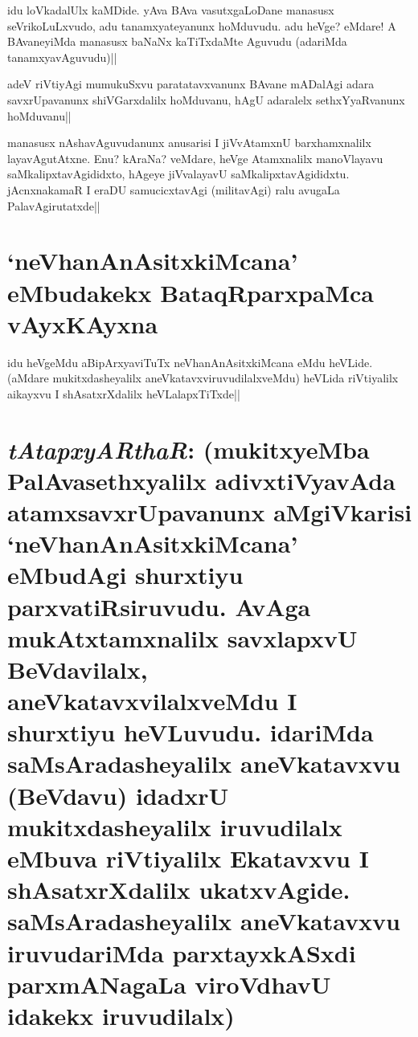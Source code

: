 \begin{artha} 
idu loVkadalUlx kaMDide. yAva BAva vasutxgaLoDane manasusx 
seVrikoLuLxvudo, adu tanamxyateyanunx hoMduvudu. adu heVge? eMdare! A 
BAvaneyiMda manasusx baNaNx kaTiTxdaMte Aguvudu (adariMda 
tanamxyavAguvudu)||
\end{artha}

\begin{artha} 
adeV riVtiyAgi mumukuSxvu paratatavxvanunx BAvane mADalAgi adara 
savxrUpavanunx shiVGarxdalilx hoMduvanu, hAgU adaralelx 
sethxYyaRvanunx hoMduvanu||
\end{artha}

\begin{artha} 
manasusx nAshavAguvudanunx anusarisi I jiVvAtamxnU barxhamxnalilx 
layavAgutAtxne. Enu? kAraNa? veMdare, heVge Atamxnalilx manoVlayavu 
saMkalipxtavAgididxto, hAgeye jiVvalayavU saMkalipxtavAgididxtu. 
jAcnxnakamaR I eraDU samucicxtavAgi (militavAgi) ralu avugaLa 
PalavAgirutatxde|| 
\end{artha}

\section*{`neVhanAnAsitxkiMcana' eMbudakekx BataqRparxpaMca vAyxKAyxna}


\begin{artha} 
idu heVgeMdu aBipArxyaviTuTx neVhanAnAsitxkiMcana eMdu heVLide. 
(aMdare mukitxdasheyalilx aneVkatavxviruvudilalxveMdu) heVLida 
riVtiyalilx aikayxvu I shAsatxrXdalilx heVLalapxTiTxde||
\end{artha}


\section*{\textit{tAtapxyARthaR}: (mukitxyeMba PalAvasethxyalilx adivxtiVyavAda 
atamxsavxrUpavanunx 
aMgiVkarisi `neVhanAnAsitxkiMcana' eMbudAgi shurxtiyu 
parxvatiRsiruvudu. AvAga mukAtxtamxnalilx savxlapxvU BeVdavilalx, 
aneVkatavxvilalxveMdu I shurxtiyu heVLuvudu. idariMda 
saMsAradasheyalilx aneVkatavxvu (BeVdavu) idadxrU mukitxdasheyalilx 
iruvudilalx eMbuva riVtiyalilx Ekatavxvu I shAsatxrXdalilx 
ukatxvAgide. saMsAradasheyalilx aneVkatavxvu iruvudariMda 
parxtayxkASxdi parxmANagaLa viroVdhavU idakekx iruvudilalx)}



